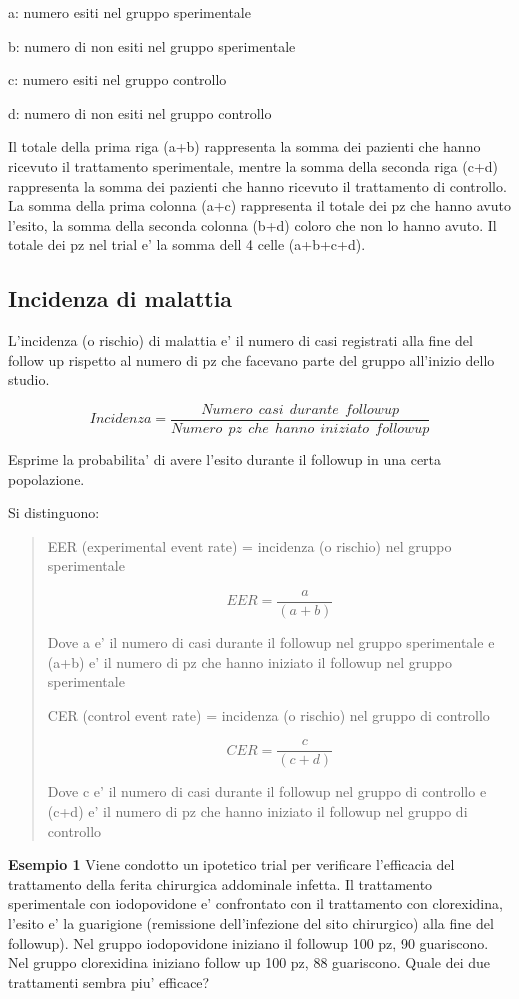 \documentclass[]{book}
\begin{document}
a: numero esiti nel gruppo sperimentale

b: numero di non esiti nel gruppo sperimentale

c: numero esiti nel gruppo controllo

d: numero di non esiti nel gruppo controllo

Il totale della prima riga (a+b) rappresenta la somma dei pazienti che hanno ricevuto il trattamento sperimentale, mentre la somma della seconda riga (c+d) rappresenta la somma dei pazienti che hanno ricevuto il trattamento di controllo. La somma della prima colonna (a+c) rappresenta il totale dei pz che hanno avuto l'esito, la somma della seconda colonna (b+d) coloro che non lo hanno avuto. Il totale dei pz nel trial e' la somma dell 4 celle (a+b+c+d).

\hypertarget{incidenza-di-malattia}{%
\subsection{Incidenza di malattia}\label{incidenza-di-malattia}}

L'incidenza (o rischio) di malattia e' il numero di casi registrati alla fine del follow up rispetto al numero di pz che facevano parte del gruppo all'inizio dello studio.

\[Incidenza = \frac{Numero\ \ casi\ \ durante\ \ followup}{Numero\ \ pz\ \ che\ \ hanno\ \ iniziato \ \  followup}\]

Esprime la probabilita' di avere l'esito durante il followup in una certa popolazione.

Si distinguono:

\begin{quote}
EER (experimental event rate) = incidenza (o rischio) nel gruppo sperimentale

\[EER = \frac{a}{(a+b)}\]

Dove a e' il numero di casi durante il followup nel gruppo sperimentale e (a+b) e' il numero di pz che hanno iniziato il followup nel gruppo sperimentale

CER (control event rate) = incidenza (o rischio) nel gruppo di controllo

\[CER = \frac{c}{(c+d)}\]

Dove c e' il numero di casi durante il followup nel gruppo di controllo e (c+d) e' il numero di pz che hanno iniziato il followup nel gruppo di controllo
\end{quote}

\textbf{Esempio 1}
Viene condotto un ipotetico trial per verificare l'efficacia del trattamento della ferita chirurgica addominale infetta. Il trattamento sperimentale con iodopovidone e' confrontato con il trattamento con clorexidina, l'esito e' la guarigione (remissione dell'infezione del sito chirurgico) alla fine del followup). Nel gruppo iodopovidone iniziano il followup 100 pz, 90 guariscono. Nel gruppo clorexidina iniziano follow up 100 pz, 88 guariscono.
Quale dei due trattamenti sembra piu' efficace?
\end{document}
